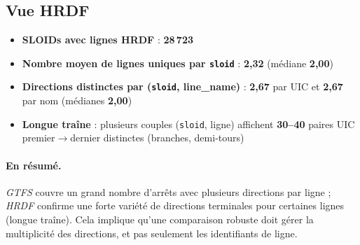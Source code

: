 \subsection*{Vue HRDF}
\begin{itemize}
  \item \textbf{SLOIDs avec lignes HRDF} : \textbf{28\,723}
  \item \textbf{Nombre moyen de lignes uniques par \texttt{sloid}} : \textbf{2,32} (médiane \textbf{2,00})
  \item \textbf{Directions distinctes par (\texttt{sloid}, line\_name)} : \textbf{2,67} par UIC et \textbf{2,67} par nom (médianes \textbf{2,00})
  \item \textbf{Longue traîne} : plusieurs couples (\texttt{sloid}, ligne) affichent \textbf{30--40} paires UIC premier$\rightarrow$dernier distinctes (branches, demi-tours)
\end{itemize}

\paragraph{En résumé.} \emph{GTFS} couvre un grand nombre d'arrêts avec plusieurs directions par ligne ; \emph{HRDF} confirme une forte variété de directions terminales pour certaines lignes (longue traîne). Cela implique qu'une comparaison robuste doit gérer la multiplicité des directions, et pas seulement les identifiants de ligne.

